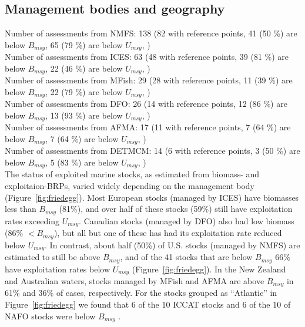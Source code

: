 \subsection*{Management bodies and geography}
\noindent
Number of assessments from NMFS: 138 (82 with reference points, 41 (50 \%) are below $B_{msy}$, 65 (79 \%) are below $U_{msy}$, ) \\
Number of assessments from ICES: 63 (48 with reference points, 39 (81 \%) are below $B_{msy}$, 22 (46 \%) are below $U_{msy}$, ) \\
Number of assessments from MFish: 29 (28 with reference points, 11 (39 \%) are below $B_{msy}$, 22 (79 \%) are below $U_{msy}$, ) \\
Number of assessments from DFO: 26 (14 with reference points, 12 (86 \%) are below $B_{msy}$, 13 (93 \%) are below $U_{msy}$, ) \\
Number of assessments from AFMA: 17 (11 with reference points, 7 (64 \%) are below $B_{msy}$, 7 (64 \%) are below $U_{msy}$, ) \\
Number of assessments from DETMCM: 14 (6 with reference points, 3 (50 \%) are below $B_{msy}$, 5 (83 \%) are below $U_{msy}$, ) \\

The status of exploited marine stocks, as estimated from biomass- and
exploitaion-BRPs, varied widely depending on the management body
(Figure~\ref{fig:friedegg}). Most European stocks (managed by
ICES) have biomasses less than $B_{msy}$
(81\%), and over half of these
stocks (59\%) still
have exploitation rates exceeding $U_{msy}$. Canadian stocks (managed
by DFO) also had low biomass (86\%
$< B_{msy}$), but all but one of these has had its exploitation rate
reduced below $U_{msy}$. In contrast, about half
(50\%) of U.S. stocks (managed by
NMFS) are estimated to still be above $B_{msy}$, and of the
41 stocks that are below $B_{msy}$
66\% have exploitation
rates below $U_{msy}$ (Figure~\ref{fig:friedegg}). In the New
Zealand and Australian waters, stocks managed by MFish and AFMA are
above $B_{msy}$ in 61\% and
36\% of cases, respectively. For
the stocks grouped as ``Atlantic'' in Figure~\ref{fig:friedegg} we
found that 6 of the
10 ICCAT stocks and
6 of the
10 of NAFO stocks were below $B_{msy}$ .



